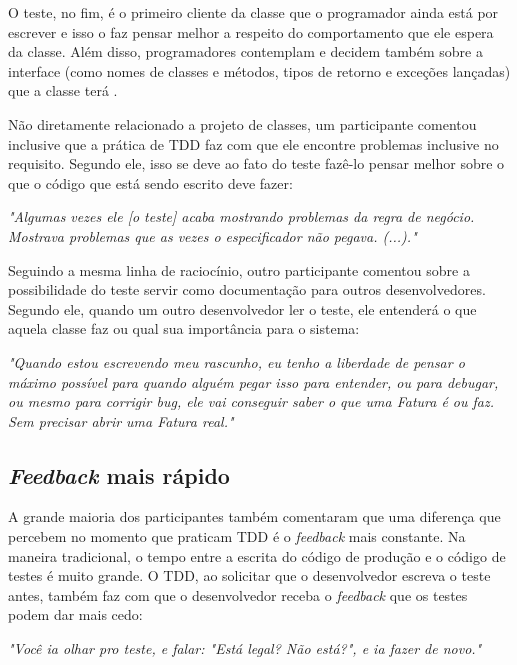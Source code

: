 O teste, no fim, é o primeiro cliente da classe que o programador ainda está por escrever e 
isso o faz pensar melhor a respeito do comportamento que ele espera da classe. Além disso,
programadores contemplam e decidem também sobre a interface (como nomes de
classes e métodos, tipos de retorno e exceções lançadas) que a classe terá
\cite{janzen-saiedian}.

Não diretamente relacionado a projeto de classes, um participante comentou inclusive
que a prática de TDD faz com que ele encontre problemas inclusive no requisito. Segundo ele,
isso se deve ao fato do teste fazê-lo pensar melhor sobre o que o código que está 
sendo escrito deve fazer:

\begin{framed}
\textit{"Algumas vezes ele [o teste] acaba mostrando problemas da regra de negócio. Mostrava problemas
que as vezes o especificador não pegava. (...)."}
\end{framed}

Seguindo a mesma linha de raciocínio, outro participante comentou sobre a possibilidade
do teste servir como documentação para outros desenvolvedores. Segundo ele, quando um outro desenvolvedor
ler o teste, ele entenderá o que aquela classe faz ou qual sua importância para o sistema:

\begin{framed}
\textit{"Quando estou escrevendo meu rascunho, eu tenho a liberdade de pensar o máximo possível para quando alguém
pegar isso para entender, ou para debugar, ou mesmo para corrigir bug, ele vai conseguir saber o que uma Fatura é ou faz. Sem
precisar abrir uma Fatura real."}
\end{framed}

\subsection{\textit{Feedback} mais rápido}

A grande maioria dos participantes também comentaram que uma diferença que percebem
no momento que praticam TDD é o \textit{feedback} mais constante. Na maneira
tradicional, o tempo entre a escrita do código de produção e o código
de testes é muito grande. O TDD, ao solicitar que o desenvolvedor
escreva o teste antes, também faz com que o desenvolvedor receba o \textit{feedback} que
os testes podem dar mais cedo:

\begin{framed}
\textit{"Você ia olhar pro teste, e falar: "Está legal? Não está?", e ia fazer de novo."}
\end{framed}

